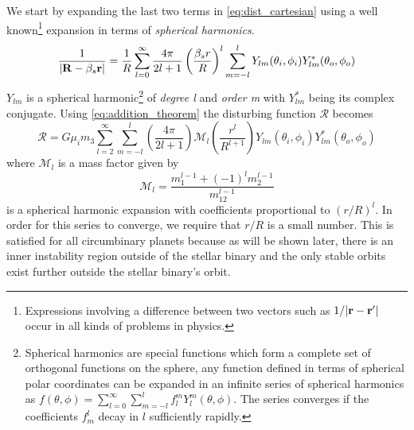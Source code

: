 We start by expanding the last two terms in \cref{eq:dist_cartesian} using 
a well known\footnote{Expressions involving a difference between two vectors 
such as $1/\lvert \boldsymbol{\mathbf{r}}-\boldsymbol{\mathbf{r}}'\rvert$ occur in all kinds of problems 
in physics.} expansion in terms of \emph{spherical harmonics}. 
\begin{equation}
    \frac{1}{\lvert \boldsymbol{\mathbf{R}} -\beta_s\boldsymbol{\mathbf{r}}\rvert}= \frac{1}{R} \sum^\infty_{l=0}
  \frac{4\pi}{2l+1}   \left( \frac{\beta_s r}{R} \right)^l
    \sum^l_{m=-l} Y_{lm}(\theta_i,\phi_i)
    Y_{lm}^*(\theta_o,\phi_o)
    \label{eq:addition_theorem}
\end{equation}
$Y_{lm}$ is a spherical harmonic\footnote{Spherical harmonics are special
functions which form a complete set of orthogonal functions on the sphere, 
any function defined in terms of spherical polar coordinates can be expanded
in an infinite series of spherical harmonics as $f(\theta,\phi)
=\sum^\infty_{l=0}\sum^l_{m=-l}f^m_lY_l^m(\theta,\phi)$. The series converges 
if the coefficients $f^l_m$ decay in $l$ sufficiently rapidly.} of
\emph{degree l} and \emph{order m} with
$Y_{lm}^*$ being its complex conjugate. Using 
\cref{eq:addition_theorem} the disturbing function $\mathcal{R}$ becomes
\begin{equation}
    \mathcal{R}=G\mu_im_3\sum^\infty_{l=2}\sum^l_{m=-l}\left( \frac{4\pi}{2l+1} 
    \right)\mathcal{M}_l\left( \frac{r^l}{R^{l+1}} \right) Y_{lm}(\theta_i,\phi_i)
    Y_{lm}^*(\theta_o,\phi_o)
\label{eq:dist_harmonics}
\end{equation}
where $\mathcal{M}_l$ is a mass factor given by
\begin{equation}
    \mathcal{M}_l= \frac{m_1^{l-1}+(-1)^lm_2^{l-1}}{m_{12}^{l-1}} 
\end{equation}
 is a spherical harmonic expansion with 
coefficients proportional to $(r/R)^l$. In order for this series
to converge, we require that $r/R$ is a small number. This is satisfied
for all circumbinary planets because as will be shown later, there is
an inner instability region outside of the stellar binary and the only
stable orbits exist further outside the stellar binary's orbit. 

